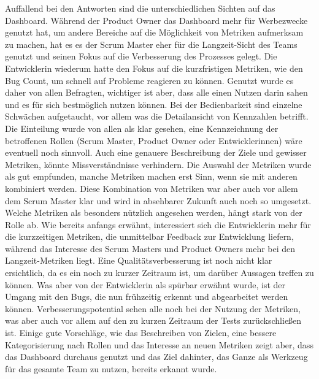 Auffallend bei den Antworten sind die unterschiedlichen Sichten auf das Dashboard.
Während der Product Owner das Dashboard mehr für Werbezwecke genutzt hat, um andere Bereiche auf die Möglichkeit von Metriken aufmerksam zu machen, hat es es der Scrum Master eher für die Langzeit-Sicht des Teams genutzt und seinen Fokus auf die Verbesserung des Prozesses gelegt.
Die Entwicklerin wiederum hatte den Fokus auf die kurzfristigen Metriken, wie den Bug Count, um schnell auf Probleme reagieren zu können.
Genutzt wurde es daher von allen Befragten, wichtiger ist aber, dass alle einen Nutzen darin sahen und es für sich bestmöglich nutzen können.
Bei der Bedienbarkeit sind einzelne Schwächen aufgetaucht, vor allem was die Detailansicht von Kennzahlen betrifft.
Die Einteilung wurde von allen als klar gesehen, eine Kennzeichnung der betroffenen Rollen (Scrum Master, Product Owner oder Entwicklerinnen) wäre eventuell noch sinnvoll.
Auch eine genauere Beschreibung der Ziele und gewisser Metriken, könnte Missverständnisse verhindern.
Die Auswahl der Metriken wurde als gut empfunden, manche Metriken machen erst Sinn, wenn sie mit anderen kombiniert werden.
Diese Kombination von Metriken war aber auch vor allem dem Scrum Master klar und wird in absehbarer Zukunft auch noch so umgesetzt.
Welche Metriken als besonders nützlich angesehen werden, hängt stark von der Rolle ab.
Wie bereits anfangs erwähnt, interessiert sich die Entwicklerin mehr für die kurzzeitigen Metriken, die unmittelbar Feedback zur Entwicklung liefern, während das Interesse des Scrum Masters und Product Owners mehr bei den Langzeit-Metriken liegt.
Eine Qualitätsverbesserung ist noch nicht klar ersichtlich, da es ein noch zu kurzer Zeitraum ist, um darüber Aussagen treffen zu können.
Was aber von der Entwicklerin als spürbar erwähnt wurde, ist der Umgang mit den Bugs, die nun frühzeitig erkennt und abgearbeitet werden können.
Verbesserungspotential sehen alle noch bei der Nutzung der Metriken, was aber auch vor allem auf den zu kurzen Zeitraum der Tests zurückschließen ist.
Einige gute Vorschläge, wie das Beschreiben von Zielen, eine bessere Kategorisierung nach Rollen und das Interesse an neuen Metriken zeigt aber, dass das Dashboard durchaus genutzt und das Ziel dahinter, das Ganze als Werkzeug für das gesamte Team zu nutzen, bereits erkannt wurde.
